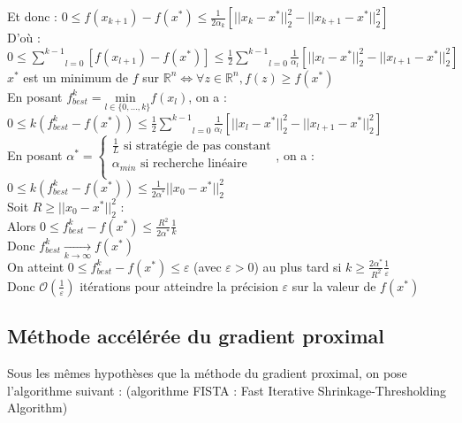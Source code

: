 \documentclass[12pt,a4paper]{article}
\begin{document}
Et donc : $0 \leq f(x_{k+1}) - f(x^*) \leq \frac{1}{2 \alpha_k} \left[ ||x_k - x^*||_2^2 - ||x_{k+1} - x^*||_2^2 \right]$\\

D'où : $0 \leq \underset{l = 0}{\overset{k-1}{\sum}}\left[ f(x_{l+1}) - f(x^*) \right] \leq \frac{1}{2} \underset{l = 0}{\overset{k-1}{\sum}} \frac{1}{\alpha_l} \left[ ||x_l - x^*||_2^2 - ||x_{l+1} - x^*||_2^2 \right]$\\
$x^*$ est un minimum de $f$ sur $\mathbb{R}^n \Leftrightarrow \forall z \in \mathbb{R}^n, f(z) \geq f(x^*)$\\


En posant $f_{best}^k = \underset{l \in \{0, \dots, k\}}{\text{min }} f(x_l)$, on a :\\
$0 \leq k(f_{best}^k - f(x^*)) \leq \frac{1}{2} \underset{l = 0}{\overset{k-1}{\sum}} \frac{1}{\alpha_l} \left[ ||x_l - x^*||_2^2 - ||x_{l+1} - x^*||_2^2 \right]$\\

En posant $\alpha^* = \begin{cases}
    \frac{1}{L} \text{ si stratégie de pas constant}\\
    \alpha_{min} \text{ si recherche linéaire}\\
\end{cases}$, on a :\\

$0 \leq k(f_{best}^k - f(x^*)) \leq \frac{1}{2 \alpha^*} ||x_0 - x^*||_2^2$\\

Soit $R \geq ||x_0 - x^*||_2^2$ :\\
Alors $0 \leq f_{best}^k - f(x^*) \leq \frac{R^2}{2 \alpha^*} \frac{1}{k}$\\

Donc $f_{best}^k \xrightarrow[k \rightarrow \infty]{} f(x^*)$\\


On atteint $0 \leq f_{best}^k - f(x^*) \leq \varepsilon$ (avec $\varepsilon > 0$) au plus tard si $k \geq \frac{2 \alpha^*}{R^2} \frac{1}{\varepsilon}$\\
Donc $\mathcal{O}(\frac{1}{\varepsilon})$ itérations pour atteindre la précision $\varepsilon$ sur la valeur de $f(x^*)$\\


\subsection{Méthode accélérée du gradient proximal}
Sous les mêmes hypothèses que la méthode du gradient proximal, on pose l'algorithme suivant : (algorithme FISTA : Fast Iterative Shrinkage-Thresholding Algorithm)\\
\end{document}
